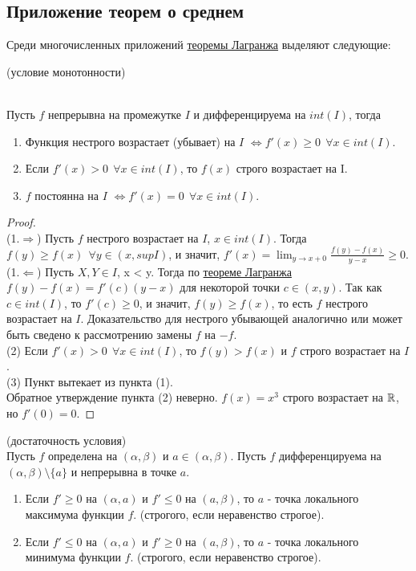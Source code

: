 \subsection{Приложение теорем о среднем}
Среди многочисленных приложений \hyperlink{lagrange}{теоремы Лагранжа} выделяют следующие:\\
\begin{theorem}\hypertarget{th10}{(условие монотонности)}\\
    Пусть $f$ непрерывна на промежутке $I$ и дифференцируема на $int(I)$, тогда
    \begin{enumerate}
        \item Функция нестрого возрастает (убывает) на $I$ $\iff f'(x) \geq 0 \ \ \forall x \in int(I)$.
        \item Если $f'(x) > 0 \ \ \forall x \in int(I)$, то $f(x)$ строго возрастает на I.
        \item $f$ постоянна на $I$ $\iff f'(x) = 0 \ \ \forall x \in int(I)$.
    \end{enumerate}
\end{theorem}

\begin{proof} \ \\
    (1.$\Rightarrow$) Пусть $f$ нестрого возрастает на $I$, $x \in int(I)$.
    Тогда $f(y) \geq f(x) \ \ \forall y \in (x, supI)$, и значит, $f'(x) = \lim_{y \to x+0} \frac{f(y)-f(x)}{y-x} \geq 0$.\\
    (1.$\Leftarrow$) Пусть $X, Y \in I$, x < y. Тогда по \hyperlink{lagrange}{теореме Лагранжа} $f(y)-f(x) = f'(c)(y-x)$ для некоторой точки $c \in (x, y)$.
    Так как $c \in int(I)$, то $f'(c) \geq 0$, и значит, $f(y) \geq f(x)$, то есть $f$ нестрого возрастает на $I$.
    Доказательство для нестрого убывающей аналогично или может быть сведено к рассмотрению замены $f$ на $-f$.\\
    (2) Если $f'(x) > 0 \ \ \forall x \in int(I)$, то $f(y) > f(x)$ и $f$ строго возрастает на $I$.\\
    (3) Пункт вытекает из пункта (1).\\
    Обратное утверждение пункта (2) неверно. $f(x) = x^3$ строго возрастает на $\mathbb{R}$, но $f'(0) = 0$.
\end{proof}

\begin{corollary}
    (достаточность условия)\\
    Пусть $f$ определена на $(\alpha, \beta)$ и $a \in (\alpha, \beta)$.
    Пусть $f$ дифференцируема на $(\alpha, \beta) \setminus \{a\}$ и непрерывна в точке $a$.
    \begin{enumerate}
        \item Если $f' \geq 0$ на $(\alpha, a)$ и $f' \leq 0$ на $(a, \beta)$, то $a$ - точка локального максимума функции $f$.
        (строгого, если неравенство строгое).
        \item Если $f' \leq 0$ на $(\alpha, a)$ и $f' \geq 0$ на $(a, \beta)$, то $a$ - точка локального минимума функции $f$.
        (строгого, если неравенство строгое).
    \end{enumerate}
\end{corollary}


